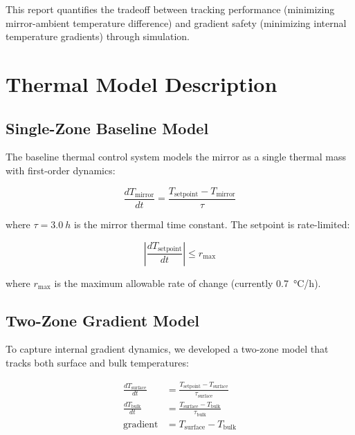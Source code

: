 \documentclass[11pt,a4paper]{article}
\begin{document}
This report quantifies the tradeoff between tracking performance (minimizing mirror-ambient temperature difference) and gradient safety (minimizing internal temperature gradients) through simulation.

\section{Thermal Model Description}

\subsection{Single-Zone Baseline Model}

The baseline thermal control system models the mirror as a single thermal mass with first-order dynamics:

\begin{equation}
    \frac{dT_{\text{mirror}}}{dt} = \frac{T_{\text{setpoint}} - T_{\text{mirror}}}{\tau}
\end{equation}

where $\tau = \SI{3.0}{h}$ is the mirror thermal time constant. The setpoint is rate-limited:

\begin{equation}
    \left| \frac{dT_{\text{setpoint}}}{dt} \right| \leq r_{\text{max}}
\end{equation}

where $r_{\text{max}}$ is the maximum allowable rate of change (currently \SI{0.7}{\celsius/h}).

\subsection{Two-Zone Gradient Model}

To capture internal gradient dynamics, we developed a two-zone model that tracks both surface and bulk temperatures:

\begin{align}
    \frac{dT_{\text{surface}}}{dt} &= \frac{T_{\text{setpoint}} - T_{\text{surface}}}{\tau_{\text{surface}}} \\[1ex]
    \frac{dT_{\text{bulk}}}{dt} &= \frac{T_{\text{surface}} - T_{\text{bulk}}}{\tau_{\text{bulk}}} \\[1ex]
    \text{gradient} &= T_{\text{surface}} - T_{\text{bulk}}
\end{align}
\end{document}
